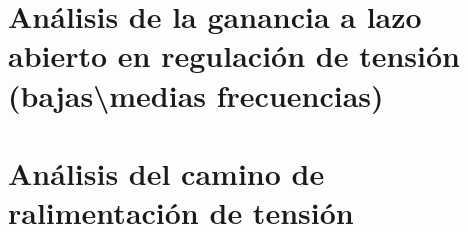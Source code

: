 \section{Análisis de la ganancia a lazo abierto en regulación de tensión (bajas\textbackslash medias frecuencias)}
\resetallcounters

\clearpage

\section{Análisis del camino de ralimentación de tensión}
\resetallcounters

\clearpage

